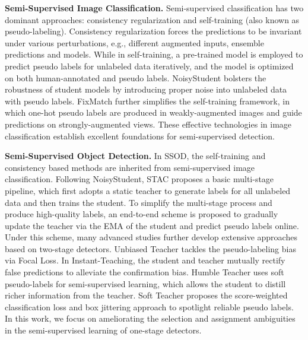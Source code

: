 \documentclass[10pt,twocolumn,letterpaper]{article}
\begin{document}
\noindent\textbf{Semi-Supervised Image Classification.} Semi-supervised classification has two dominant approaches: consistency regularization \cite{TemporalEns,MeanTea,UDA} and self-training\cite{Mixmatch,Fixmatch,PseudoLabel,NoisyStudent} (also known as pseudo-labeling). 
Consistency regularization forces the predictions to be invariant under various perturbations, e.g., different augmented inputs\cite{UDA}, ensemble predictions and models\cite{MeanTea}.
While in self-training, a pre-trained model is employed to predict pseudo labels for unlabeled data iteratively, and the model is optimized on both human-annotated and pseudo labels. 
NoisyStudent\cite{NoisyStudent} bolsters the robustness of student models by introducing proper noise into unlabeled data with pseudo labels.
FixMatch\cite{Fixmatch} further simplifies the self-training framework, in which one-hot pseudo labels are produced in weakly-augmented images and guide predictions on strongly-augmented views.
These effective technologies in image classification establish excellent foundations for semi-supervised detection.

\noindent\textbf{Semi-Supervised Object Detection.} In SSOD, the self-training and consistency based methods are inherited from semi-supervised image classification.
Following NoisyStudent\cite{NoisyStudent}, STAC\cite{stac} proposes a basic multi-stage pipeline, which first adopts a static teacher to generate labels for all unlabeled data and then trains the student.
To simplify the multi-stage process and produce high-quality labels, an end-to-end scheme\cite{UnbiasedTeacher,InstantTea,HumbleTeacher,SoftTea} is proposed to gradually update the teacher via the EMA of the student and predict pseudo labels online.
Under this scheme, many advanced studies further develop extensive approaches based on two-stage detectors.
Unbiased Teacher\cite{UnbiasedTeacher} tackles the pseudo-labeling bias via Focal Loss\cite{Focalloss}.
In Instant-Teaching\cite{InstantTea}, the student and teacher mutually rectify false predictions to alleviate the confirmation bias.
Humble Teacher\cite{HumbleTeacher} uses soft pseudo-labels for semi-supervised learning, which allows the student to distill richer information from the teacher.
Soft Teacher\cite{SoftTea} proposes the score-weighted classification loss and box jittering approach to spotlight reliable pseudo labels.
In this work, we focus on ameliorating the selection and assignment ambiguities in the semi-supervised learning of one-stage detectors.
\end{document}
